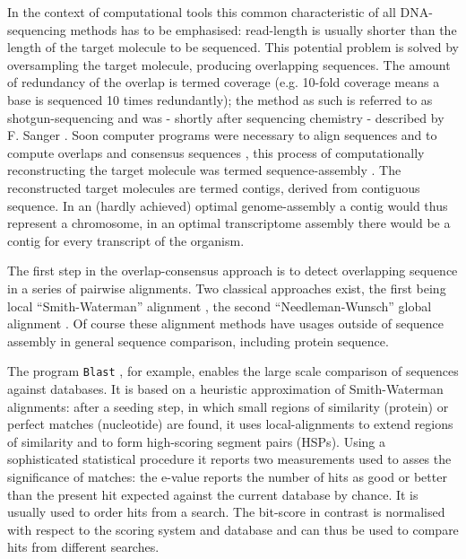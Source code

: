 In the context of computational tools this common characteristic of
all DNA-sequencing methods has to be emphasised: read-length is
usually shorter than the length of the target molecule to be
sequenced. This potential problem is solved by oversampling the target
molecule, producing overlapping sequences. The amount of redundancy of
the overlap is termed coverage (e.g. 10-fold coverage means a base is
sequenced 10 times redundantly); the method as such is referred to as
shotgun-sequencing and was - shortly after sequencing chemistry -
described by F. Sanger \cite{pmid6260957}. Soon computer programs were
necessary to align sequences and to compute overlaps and consensus
sequences \cite{pmid461197}, this process of computationally
reconstructing the target molecule was termed sequence-assembly
\cite{pmid6251542}. The reconstructed target molecules are termed
contigs, derived from contiguous sequence. In an (hardly achieved)
optimal genome-assembly a contig would thus represent a chromosome, in
an optimal transcriptome assembly there would be a contig for every
transcript of the organism.

The first step in the overlap-consensus approach is to detect
overlapping sequence in a series of pairwise alignments. Two classical
approaches exist, the first being local ``Smith-Waterman'' alignment
\cite{pmid7265238}, the second ``Needleman-Wunsch'' global alignment
\cite{pmid7334527}. Of course these alignment methods have usages
outside of sequence assembly in general sequence comparison, including
protein sequence.

The program \texttt{Blast} \cite{pmid2231712}, for example, enables
the large scale comparison of sequences against databases. It is based
on a heuristic approximation of Smith-Waterman alignments: after a
seeding step, in which small regions of similarity (protein) or
perfect matches (nucleotide) are found, it uses local-alignments to
extend regions of similarity and to form high-scoring segment pairs
(HSPs). Using a sophisticated statistical procedure it reports two
measurements used to asses the significance of matches: the e-value
reports the number of hits as good or better than the present hit
expected against the current database by chance. It is usually used to
order hits from a search. The bit-score in contrast is normalised with
respect to the scoring system and database and can thus be used to
compare hits from different searches.

